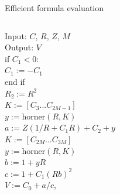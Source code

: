 \documentclass{beamer}
\newenvironment{ppl}{\fontfamily{ppl}\selectfont}{\par}
\def\spc{\hspace*{0.5cm}} 			%
\begin{document}
\begin{frame}{Efficient formula evaluation}
\begin{columns}[c]
\begin{column}{0.5\textwidth}
\begin{ppl}
                Input: $C$, $R$, $Z$, $M$\\
                Output: $V$ \\
                if $C_1 < 0$: \\
                \spc $C_1 := -C_1$ \\
                end if \\
                $R_2 := R^2$ \\
                $K := [C_3 ... C_{2M-1}]$\\
                $y := \text{horner}(R, K)$\\
                $a := Z(1/R + C_1R) + C_2 + y$\\
                $K := [C_{2M} ... C_{3M}]$\\
                $y := \text{horner}(R, K)$\\
                $b := 1 + yR$\\
                $c := 1 + C_1(Rb)^2$\\
                $V := C_0 + a/c$, \\
            \end{ppl}
        \end{column}
    \end{columns}
\end{frame}
\fi

\end{document}
